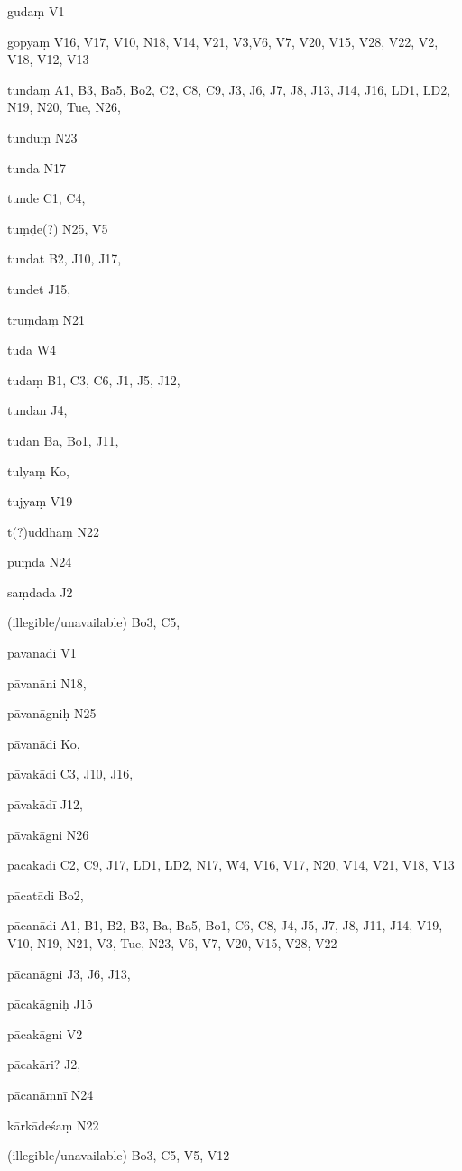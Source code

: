 \begin{ekdosis}
\begin{marma}[hp01_055]
\begin{marma}[hp02_009]
\begin{marma}[hp02_011]
\begin{marma}[hp02_34b]
\item[gudaṃ] V1
\item[gopyaṃ] V16, V17, V10, N18, V14, V21, V3,V6, V7, V20, V15, V28, V22, V2, V18, V12, V13
\item[tundaṃ] A1, B3, Ba5, Bo2, C2, C8, C9, J3, J6, J7, J8, J13, J14, J16, LD1, LD2, N19, N20, Tue, N26, 
\item[tunduṃ] N23
\item[tunda] N17
\item[tunde] C1, C4,  
\item[tuṃḍe(?)] N25, V5
\item[tundat] B2, J10, J17, 
\item[tundet] J15, 
\item[truṃdaṃ] N21
\item[tuda] W4
\item[tudaṃ] B1, C3, C6, J1, J5, J12,  
\item[tundan] J4,
\item[tudan] Ba, Bo1, J11, 
\item[tulyaṃ] Ko,
\item[tujyaṃ] V19
\item[t(?)uddhaṃ] N22
\item[puṃda] N24
\item[saṃdada] J2
\item[(illegible/unavailable)] Bo3, C5,
 \begin{description}

        \end{description}
\end{marma}

\begin{marma}[hp02_35a]
\item[pāvanādi] V1
\item[pāvanāni] N18,
\item[pāvanāgniḥ] N25
\item[pāvanādi] Ko,
\item[pāvakādi] C3, J10, J16,
\item[pāvakādī] J12,
\item[pāvakāgni] N26
\item[pācakādi] C2, C9, J17, LD1, LD2, N17, W4, V16, V17, N20, V14, V21, V18, V13
\item[pācatādi] Bo2, 
\item[pācanādi] A1, B1, B2, B3, Ba, Ba5, Bo1, C6, C8, J4, J5, J7, J8, J11, J14, V19, V10, N19, N21, V3, Tue, N23, V6, V7, V20, V15, V28, V22
\item[pācanāgni] J3, J6, J13,  
\item[pācakāgniḥ] J15
\item[pācakāgni] V2
\item[pācakāri?] J2,
\item[pācanāṃnī] N24
\item[kārkādeśaṃ] N22
\item[(illegible/unavailable)] Bo3, C5, V5, V12
 \begin{description}


\end{description}
\end{marma}
\end{marma}
\end{marma}
\end{marma}
\end{ekdosis}
